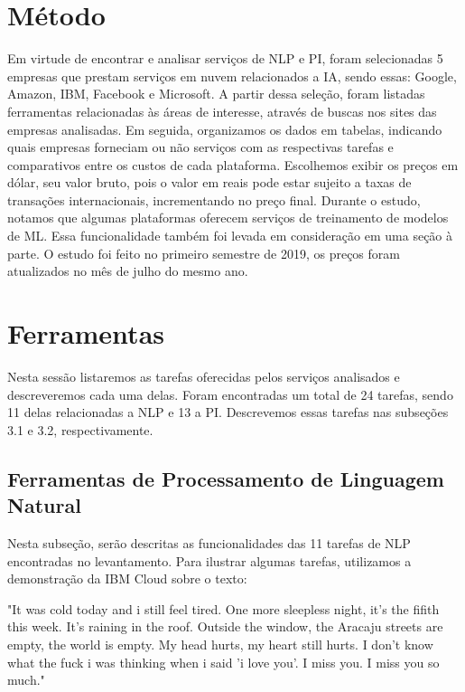 \documentclass{article}
\begin{document}
\section{Método}
Em virtude de encontrar e analisar serviços de NLP e PI, foram selecionadas 5 empresas que prestam serviços em nuvem relacionados a IA, sendo essas: Google, Amazon, IBM, Facebook e Microsoft. A partir dessa seleção, foram listadas ferramentas relacionadas às áreas de interesse, através de buscas nos sites das empresas analisadas. Em seguida, organizamos os dados em tabelas, indicando quais empresas forneciam ou não serviços com as respectivas tarefas e comparativos entre os custos de cada plataforma. Escolhemos exibir os preços em dólar, seu valor bruto, pois o valor em reais pode estar sujeito a taxas de transações internacionais, incrementando no preço final. Durante o estudo, notamos que algumas plataformas oferecem serviços de treinamento de modelos de ML. Essa funcionalidade também foi levada em consideração em uma seção à parte. O estudo foi feito no primeiro semestre de 2019, os preços foram atualizados no mês de julho do mesmo ano.

\section{Ferramentas}
Nesta sessão listaremos as tarefas oferecidas pelos serviços analisados e descreveremos cada uma delas. Foram encontradas um total de 24 tarefas, sendo 11 delas relacionadas a NLP e 13 a PI. Descrevemos essas tarefas nas subseções 3.1 e 3.2, respectivamente.

\subsection{Ferramentas de Processamento de Linguagem Natural}

Nesta subseção, serão descritas as funcionalidades das 11 tarefas de NLP encontradas no levantamento. Para ilustrar algumas tarefas, utilizamos a demonstração da IBM Cloud sobre o texto: 

\begin{displayquote}
"It was cold today and i still feel tired. One more sleepless night, it's the fifith this week. It's raining in the roof. Outside the window, the Aracaju streets are empty, the world is empty. My head hurts, my heart still hurts. I don't know what the fuck i was thinking when i said 'i love you'. I miss you. I miss you so much."
\end{displayquote}{}
\end{document}

